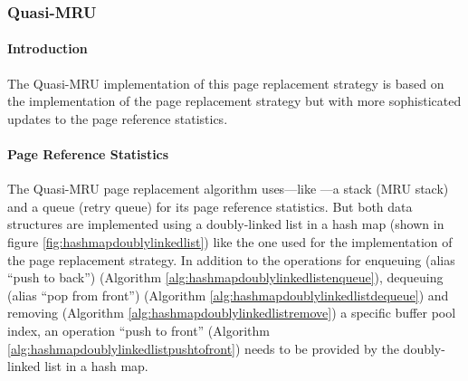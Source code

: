 \subsubsection{Quasi-MRU} \label{subsubsec:quasi-mru}

\paragraph{Introduction}

    The Quasi-MRU implementation of this page replacement strategy is based on the  implementation of the  page replacement strategy but with more sophisticated updates to the page reference statistics.

\paragraph{Page Reference Statistics}

    The Quasi-MRU page replacement algorithm uses---like ---a stack (MRU stack) and a queue (retry queue) for its page reference statistics. But both data structures are implemented using a doubly-linked list in a hash map (shown in figure \ref{fig:hashmapdoublylinkedlist}) like the one used for the  implementation of the  page replacement strategy. In addition to the operations for enqueuing (alias ``push to back'') (Algorithm \ref{alg:hashmapdoublylinkedlistenqueue}), dequeuing (alias ``pop from front'') (Algorithm \ref{alg:hashmapdoublylinkedlistdequeue}) and removing (Algorithm \ref{alg:hashmapdoublylinkedlistremove}) a specific buffer pool index, an operation ``push to front'' (Algorithm \ref{alg:hashmapdoublylinkedlistpushtofront}) needs to be provided by the doubly-linked list in a hash map.


